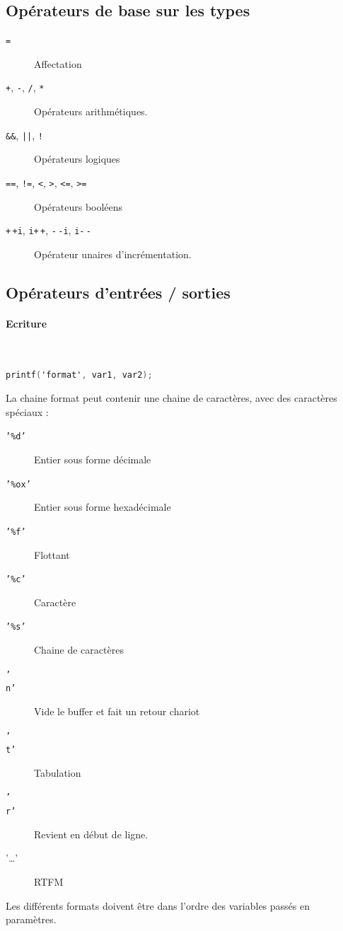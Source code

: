 \documentclass[12pt,a4paper,openany]{book}
\begin{document}
\subsection{Opérateurs de base sur les types}
\begin{description}
	\item[\texttt{=}] Affectation
	\item[\texttt{+}, \texttt{-}, \texttt{/}, \texttt{*}] Opérateurs arithmétiques.
	\item[\texttt{\&\&}, \texttt{||}, \texttt{!}] Opérateurs logiques 
	\item[\texttt{==}, \texttt{!=}, \texttt{<}, \texttt{>}, \texttt{<=}, \texttt{>=}] Opérateurs booléens
	\item[\texttt{+$\,$+i}, \texttt{i+$\,$+}, \texttt{-$\,$-i}, \texttt{i-$\,$-}] Opérateur unaires d'incrémentation.
\end{description}
\subsection{Opérateurs d'entrées / sorties}
\paragraph{Ecriture}~\\
\begin{lstlisting}[language=C, caption=Syntaxe de l'appel de printf]
printf('format', var1, var2);
\end{lstlisting}
La chaine format peut contenir une chaine de caractères, avec des caractères spéciaux : 
\begin{description}
	\item[\texttt{'\%d'}] Entier sous forme décimale
	\item[\texttt{'\%ox'}] Entier sous forme hexadécimale
	\item[\texttt{'\%f'}] Flottant 
	\item[\texttt{'\%c'}] Caractère 
	\item[\texttt{'\%s'}] Chaine de caractères 
	\item[\texttt{'\\n'}] Vide le buffer et fait un retour chariot 
	\item[\texttt{'\\t'}] Tabulation 
	\item[\texttt{'\\r'}] Revient en début de ligne.
	\item['\ldots'] RTFM	
\end{description}
Les différents formats doivent être dans l'ordre des variables passés en paramètres.
\end{document}
